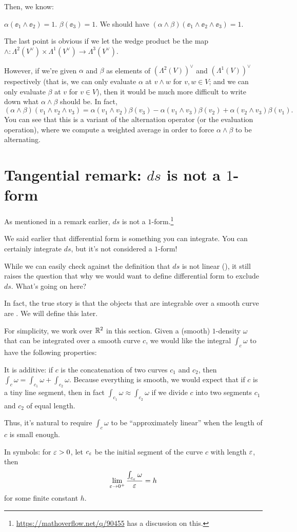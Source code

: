 Then, we know:
\begin{itemize}
	\ii $\alpha(\ee_1 \wedge \ee_2) = 1$.
	\ii $\beta(\ee_3) = 1$.
	\ii We should have $(\alpha \wedge \beta)(\ee_1 \wedge \ee_2 \wedge \ee_3) = 1$.
\end{itemize}
The last point is obvious if we let the wedge product be the map $\wedge \colon
\Lambda^2(V^\vee) \times \Lambda^1(V^\vee) \to \Lambda^3(V^\vee)$.

However, if we're given $\alpha$ and $\beta$ as elements of $(\Lambda^2(V))^\vee$ and
$(\Lambda^1(V))^\vee$ respectively (that is, we can only evaluate $\alpha$ at $v \wedge w$ for $v, w
\in V$; and we can only evaluate $\beta$ at $v$ for $v \in V$), then it would be much more difficult
to write down what $\alpha \wedge \beta$ should be. In fact,
\[
	(\alpha \wedge \beta)(v_1 \wedge v_2 \wedge v_3) =
	\alpha(v_1 \wedge v_2) \beta(v_3)
	- \alpha(v_1 \wedge v_3) \beta(v_2)
	+ \alpha(v_2 \wedge v_3) \beta(v_1).
\]
You can see that this is a variant of the alternation operator (or the evaluation operation),
where we compute a weighted average in order to force $\alpha \wedge \beta$ to be alternating.

\section{Tangential remark: $ds$ is not a $1$-form}

As mentioned in a remark earlier, $ds$ is not a
$1$-form.\footnote{\url{https://mathoverflow.net/q/90455} has a discussion on this.}

We said earlier that differential form is something you can integrate. You can certainly integrate
$ds$, but it's not considered a $1$-form!

While we can easily check against the definition that $ds$ is not linear
(), it still raises the question that why we would want to
define differential form to exclude $ds$.
What's going on here?

In fact, the true story is that the objects that are integrable over a smooth curve are
. We will define this later.

For simplicity, we work over $\mathbb R^2$ in this section.
Given a (smooth) $1$-density $\omega$ that can be integrated over a smooth curve $c$,
we would like the integral $\int_c \omega$ to have the following properties:
\begin{itemize}
	\ii It is additive: if $c$ is the concatenation of two curves $c_1$ and $c_2$, then
	$\int_c \omega = \int_{c_1} \omega + \int_{c_2} \omega$.
	\ii Because everything is smooth, we would expect that if $c$ is a tiny line segment,
	then in fact $\int_{c_1} \omega \approx \int_{c_2} \omega$ if we divide $c$ into two segments
	$c_1$ and $c_2$ of equal length.

	Thus, it's natural to require $\int_c \omega$ to be ``approximately linear'' when the length of
	$c$ is small enough.

	In symbols: for $\varepsilon > 0$, let $c_\varepsilon$ be the initial segment of the curve $c$ with length
	$\varepsilon$, then
	\[ \lim_{\varepsilon \to 0^+} \frac{\int_{c_\varepsilon} \omega}{\varepsilon} = h \]
	for some finite constant $h$.
\end{itemize}

